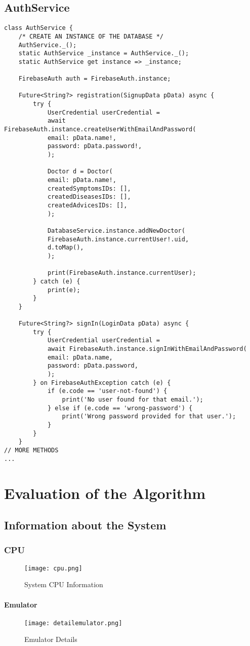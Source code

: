 \pagebreak
\section{AuthService}
\begin{lstlisting}[caption=AuthService]
class AuthService {
	/* CREATE AN INSTANCE OF THE DATABASE */
	AuthService._();
	static AuthService _instance = AuthService._();
	static AuthService get instance => _instance;
	
	FirebaseAuth auth = FirebaseAuth.instance;
	
	Future<String?> registration(SignupData pData) async {
		try {
			UserCredential userCredential =
			await FirebaseAuth.instance.createUserWithEmailAndPassword(
			email: pData.name!,
			password: pData.password!,
			);
			
			Doctor d = Doctor(
			email: pData.name!,
			createdSymptomsIDs: [],
			createdDiseasesIDs: [],
			createdAdvicesIDs: [],
			);
			
			DatabaseService.instance.addNewDoctor(
			FirebaseAuth.instance.currentUser!.uid,
			d.toMap(),
			);
			
			print(FirebaseAuth.instance.currentUser);
		} catch (e) {
			print(e);
		}
	}
	
	Future<String?> signIn(LoginData pData) async {
		try {
			UserCredential userCredential =
			await FirebaseAuth.instance.signInWithEmailAndPassword(
			email: pData.name,
			password: pData.password,
			);
		} on FirebaseAuthException catch (e) {
			if (e.code == 'user-not-found') {
				print('No user found for that email.');
			} else if (e.code == 'wrong-password') {
				print('Wrong password provided for that user.');
			}
		}
	}
// MORE METHODS
...
\end{lstlisting}
\chapter{Evaluation of the Algorithm}
\section{Information about the System}
\subsection{CPU}
\begin{figure}[H]
	\centering
	\texttt{[image: cpu.png]}
	\caption{System CPU Information}
\end{figure}
\subsubsection{Emulator}
\begin{figure}[H]
	\centering
	\texttt{[image: detailemulator.png]}
	\caption{Emulator Details}
\end{figure}
\pagebreak
